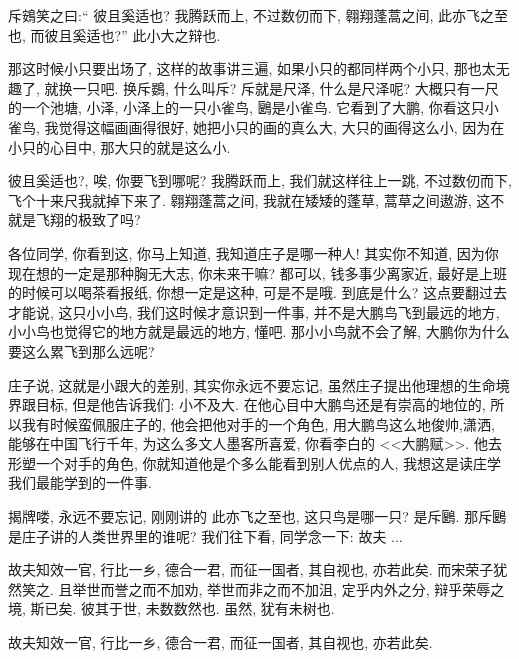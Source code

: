 \documentclass[11pt]{article}
\begin{document}
\begin{center}
	{\color{magenta} 斥鴳笑之曰:“ 彼且奚适也? 我腾跃而上, 不过数仞而下, 翱翔蓬蒿之间, 此亦飞之至也, 而彼且奚适也?” 此小大之辩也.}
\end{center}

\vspace{-0.5cm}

那这时候小只要出场了, 这样的故事讲三遍, 如果小只的都同样两个小只, 那也太无趣了, 就换一只吧. 换斥鷃, 什么叫斥? 斥就是尺泽, 什么是尺泽呢? 大概只有一尺的一个池塘, 小泽, 小泽上的一只小雀鸟, 鶠是小雀鸟. 它看到了大鹏, 你看这只小雀鸟, 我觉得这幅画画得很好, 她把小只的画的真么大, 大只的画得这么小, 因为在小只的心目中, 那大只的就是这么小. 

{\color{blue} 彼且奚适也?}, 唉, 你要飞到哪呢? {\color{blue} 我腾跃而上}, 我们就这样往上一跳, {\color{blue} 不过数仞而下}, 飞个十来尺我就掉下来了. {\color{blue}  翱翔蓬蒿之间}, 我就在矮矮的蓬草, 蒿草之间遨游, 这不就是飞翔的极致了吗? 

各位同学, 你看到这, 你马上知道, 我知道庄子是哪一种人! 其实你不知道, 因为你现在想的一定是那种胸无大志, 你未来干嘛? 都可以, 钱多事少离家近, 最好是上班的时候可以喝茶看报纸, 你想一定是这种, 可是不是哦. 到底是什么? 这点要翻过去才能说, 这只小小鸟, 我们这时候才意识到一件事, 并不是大鹏鸟飞到最远的地方, 小小鸟也觉得它的地方就是最远的地方, 懂吧. 那小小鸟就不会了解, 大鹏你为什么要这么累飞到那么远呢?  

庄子说, 这就是小跟大的差别, 其实你永远不要忘记, 虽然庄子提出他理想的生命境界跟目标, 但是他告诉我们: 小不及大. 在他心目中大鹏鸟还是有崇高的地位的, 所以我有时候蛮佩服庄子的, 他会把他对手的一个角色, 用大鹏鸟这么地俊帅,潇洒, 能够在中国飞行千年, 为这么多文人墨客所喜爱, 你看李白的 <<大鹏赋>>. 他去形塑一个对手的角色, 你就知道他是个多么能看到别人优点的人, 我想这是读庄学我们最能学到的一件事.

揭牌喽, 永远不要忘记, 刚刚讲的 {\color{blue} 此亦飞之至也}, 这只鸟是哪一只? 是斥鶠. 那斥鶠是庄子讲的人类世界里的谁呢? 我们往下看, 同学念一下: {\color{blue} 故夫 ...}

{\color{blue} 故夫知效一官, 行比一乡, 德合一君, 而征一国者, 其自视也, 亦若此矣. 而宋荣子犹然笑之. 且举世而誉之而不加劝, 举世而非之而不加沮, 定乎内外之分, 辩乎荣辱之境, 斯已矣. 彼其于世, 未数数然也. 虽然, 犹有未树也.}

\begin{center}
	{\color{magenta} 故夫知效一官, 行比一乡, 德合一君, 而征一国者, 其自视也, 亦若此矣.}
\end{center}

\vspace{-0.5cm}
\end{document}
